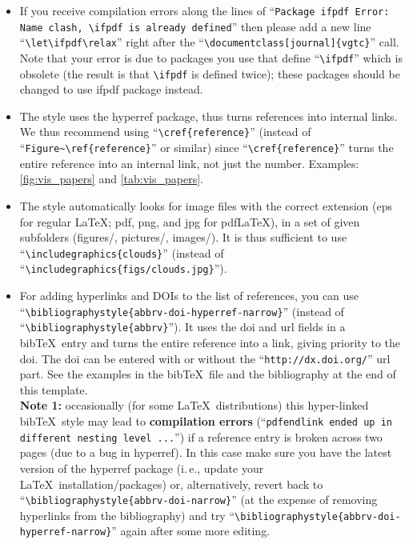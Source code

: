 \documentclass{vgtc}                          %
\begin{document}
\begin{itemize}
\item If you receive compilation errors along the lines of ``\texttt{Package ifpdf Error: Name clash, \textbackslash ifpdf is already defined}'' then please add a new line ``\texttt{\textbackslash let\textbackslash ifpdf\textbackslash relax}'' right after the ``\texttt{\textbackslash documentclass[journal]\{vgtc\}}'' call. Note that your error is due to packages you use that define ``\texttt{\textbackslash ifpdf}'' which is obsolete (the result is that \texttt{\textbackslash ifpdf} is defined twice); these packages should be changed to use ifpdf package instead.
\item The style uses the hyperref package, thus turns references into internal links. We thus recommend using ``\texttt{\textbackslash cref\{reference\}}'' (instead of ``\texttt{Figure\~{}\textbackslash ref\{reference\}}'' or similar) since ``\texttt{\textbackslash cref\{reference\}}'' turns the entire reference into an internal link, not just the number. Examples: \cref{fig:vis_papers} and \cref{tab:vis_papers}.
\item The style automatically looks for image files with the correct extension (eps for regular \LaTeX; pdf, png, and jpg for pdf\LaTeX), in a set of given subfolders (figures/, pictures/, images/). It is thus sufficient to use ``\texttt{\textbackslash includegraphics\{clouds\}}'' (instead of ``\texttt{\textbackslash includegraphics\{figs/clouds.jpg\}}'').
\item For adding hyperlinks and DOIs to the list of references, you can use ``\texttt{\textbackslash bibliographystyle\{abbrv-doi-hyperref-narrow\}}'' (instead of ``\texttt{\textbackslash bibliographystyle\{abbrv\}}''). It uses the doi and url fields in a bib\TeX\ entry and turns the entire reference into a link, giving priority to the doi. The doi can be entered with or without the ``\texttt{http://dx.doi.org/}'' url part. See the examples in the bib\TeX\ file and the bibliography at the end of this template.\\[1em]
\textbf{Note 1:} occasionally (for some \LaTeX\ distributions) this hyper-linked bib\TeX\ style may lead to \textbf{compilation errors} (``\texttt{pdfendlink ended up in different nesting level ...}'') if a reference entry is broken across two pages (due to a bug in hyperref). In this case make sure you have the latest version of the hyperref package (i.\,e., update your \LaTeX\ installation/packages) or, alternatively, revert back to ``\texttt{\textbackslash bibliographystyle\{abbrv-doi-narrow\}}'' (at the expense of removing hyperlinks from the bibliography) and try ``\texttt{\textbackslash bibliographystyle\{abbrv-doi-hyperref-narrow\}}'' again after some more editing.\\[1em]

\end{itemize}
\end{document}
